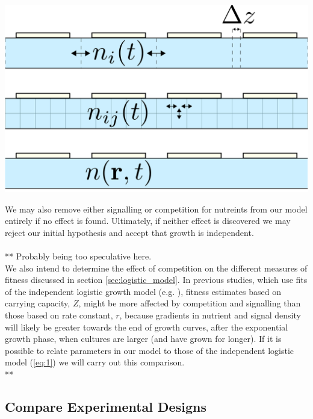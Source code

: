 \begin{Figure}
  \centering
  \includegraphics[width=\linewidth]{height_dep_miniqfa_delta_z}
  \label{fig:height_dependence}
\end{Figure}

We may also remove either signalling or competition for nutreints from
our model entirely if no effect is found. Ultimately, if neither
effect is discovered we may reject our initial hypothesis and accept
that growth is independent.
\\\\
** Probably being too speculative here.
\\
We also intend to determine the effect of competition on the different
measures of fitness discussed in section \ref{sec:logistic_model}. In
previous studies, which use fits of the independent logistic growth
model (e.g. \citet{Addinall2011}), fitness estimates based on carrying
capacity, \(Z\), might be more affected by competition and signalling
than those based on rate constant, \(r\), because gradients in nutrient
and signal density will likely be greater towards the end of growth
curves, after the exponential growth phase, when cultures are larger
(and have grown for longer). If it is possible to relate parameters in
our model to those of the independent logistic model (\ref{eq:1}) we
will carry out this comparison.
\\
**


\subsection{Compare Experimental Designs}
\label{sec:comp-exper-designs}

